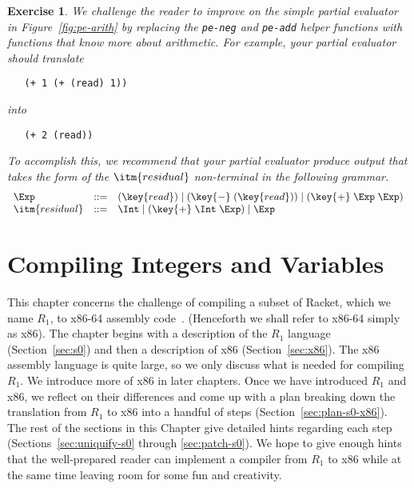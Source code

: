 \documentclass[11pt]{book}
\newcommand{\rn}[1]{{\color{comment-red}{(RRN: #1)}}}
\newcommand{\rn}[1]{}
\newtheorem{exercise}[theorem]{Exercise}
\begin{document}
\rn{Do we like the explicit whitespace?  I've never been fond of it, in part
  because it breaks copy/pasting.  But, then again, so do most of the quotes.}

\begin{exercise}
\normalfont %
We challenge the reader to improve on the simple partial evaluator in
Figure~\ref{fig:pe-arith} by replacing the \texttt{pe-neg} and
\texttt{pe-add} helper functions with functions that know more about
arithmetic. For example, your partial evaluator should translate
\begin{lstlisting}
   (+ 1 (+ (read) 1))
\end{lstlisting}
into
\begin{lstlisting}
   (+ 2 (read))
\end{lstlisting}
To accomplish this, we recommend that your partial evaluator produce
output that takes the form of the $\itm{residual}$ non-terminal in the
following grammar.
\[
\begin{array}{lcl}
\Exp &::=& (\key{read}) \mid (\key{-} \;(\key{read})) \mid (\key{+} \; \Exp \; \Exp)\\
\itm{residual} &::=& \Int \mid (\key{+}\; \Int\; \Exp) \mid \Exp
\end{array}
\]
\end{exercise}


\chapter{Compiling Integers and Variables}
\label{ch:int-exp}

This chapter concerns the challenge of compiling a subset of Racket,
which we name $R_1$, to x86-64 assembly code~\citep{Intel:2015aa}.
(Henceforth we shall refer to x86-64 simply as x86).  The chapter
begins with a description of the $R_1$ language (Section~\ref{sec:s0})
and then a description of x86 (Section~\ref{sec:x86}). The
x86 assembly language is quite large, so we only discuss what is
needed for compiling $R_1$. We introduce more of x86 in later
chapters. Once we have introduced $R_1$ and x86, we reflect on
their differences and come up with a plan breaking down the
translation from $R_1$ to x86 into a handful of steps
(Section~\ref{sec:plan-s0-x86}).  The rest of the sections in this
Chapter give detailed hints regarding each step
(Sections~\ref{sec:uniquify-s0} through \ref{sec:patch-s0}).  We hope
to give enough hints that the well-prepared reader can implement a
compiler from $R_1$ to x86 while at the same time leaving room for
some fun and creativity.
\end{document}
